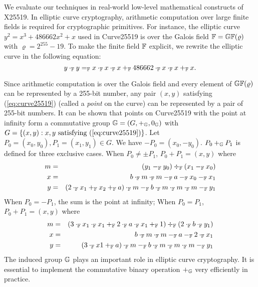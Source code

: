 
We evaluate our techniques in real-world low-level mathematical
constructs of X25519. 
In elliptic curve cryptography, arithmetic computation over
large finite fields is required for cryptographic primitives. For
instance, the elliptic curve $y^2 = x^3 + 486662 x^2 + x$ used in 
Curve25519 is over the Galois field $\mathbb{F} = \mathbb{GF}(\varrho)$ with
$\varrho = 2^{255} - 19$. To
make the finite field $\mathbb{F}$ explicit, we rewrite the elliptic
curve in the following equation: 
\begin{equation}
  \label{eq:curve25519}
  y \cdot_{\mathbb{F}} y =_{\mathbb{F}} x \cdot_{\mathbb{F}} x \cdot_{\mathbb{F}} x +_{\mathbb{F}}
  486662 \cdot_{\mathbb{F}} x \cdot_{\mathbb{F}} x +_{\mathbb{F}} x.
\end{equation}

Since arithmetic computation is over the Galois field and every
element of $\mathbb{GF}(\varrho)$ can be represented by a 255-bit number,
any pair $(x, y)$ satisfying (\ref{eq:curve25519}) (called a
\emph{point} on the curve) can be represented by a pair of 255-bit
numbers. It can be shown that points on Curve25519 with the point at
infinity form a commutative group $\mathbb{G} = (G, +_{\mathbb{G}}, 0_{\mathbb{G}})$
with $G = \{ (x, y) : x, y \textmd{ satisfying } (\ref{eq:curve25519})
\}$. Let $P_0 = (x_0, y_0), P_1 = (x_1, y_1) \in G$. We have $-P_0 =
(x_0, -y_0)$. $P_0 +_{\mathbb{G}} P_1$ is defined for three exclusive
cases. When $P_0 \neq \pm P_1$, $P_0 + P_1 = (x, y)$ where
\begin{eqnarray}
  m & = & (y_1 \Fminus y_0) \Fdiv (x_1 \Fminus x_0)\\\nonumber
  x & = & b \Ftimes m \Ftimes m \Fminus a \Fminus x_0 \Fminus x_1\\ \nonumber
  y & = & %
          (2 \Ftimes x_1 \Fplus x_2 \Fplus a )\Ftimes m
          \Fminus b \Ftimes m \Ftimes m \Ftimes m\Fminus y_1
  \label{eq:curve25519-group}
\end{eqnarray}
When $P_0=-P_1$, the sum is the point at infinity; When $P_0= P_1$,
$P_0 + P_1 = (x, y)$ where
\begin{eqnarray}
  \label{eq:curve25519-dbl}
  m &=& (3  \cdot_{\mathbb{F}} x_1 \cdot_{\mathbb{F}} x_1 +_{\mathbb{F}} 2\cdot_{\mathbb{F}} a\cdot_{\mathbb{F}} x_1+_{\mathbb{F}} 1) 
        \div_{\mathbb{F}} (2\cdot_{\mathbb{F}} b\cdot_{\mathbb{F}} y_1) \\ \nonumber
   x &=& b \cdot_{\mathbb{F}} m \cdot_{\mathbb{F}} m -_{\mathbb{F}} a -_{\mathbb{F}} 2 \cdot_{\mathbb{F}} x_1 \\ \nonumber
   y &=& (3 \cdot_{\mathbb{F}} x1+_{\mathbb{F}} a) \cdot_{\mathbb{F}} m -_{\mathbb{F}} b \cdot_{\mathbb{F}} m \cdot_{\mathbb{F}} m \cdot_{\mathbb{F}} m-_{\mathbb{F}} y_1
\end{eqnarray}
%
The induced group $\mathbb{G}$
plays an important role in elliptic curve cryptography. It is
essential to implement the commutative binary operation $+_{\mathbb{G}}$ very
efficiently in practice.

